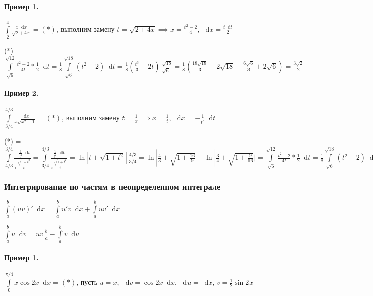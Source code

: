 \documentclass{article}
\newcommand*\diff{\mathop{}\!\mathrm{d}}
\begin{document}
\paragraph{Пример 1.} $\int\limits_{2}^{4} \frac{x \diff x}{\sqrt{2 + 4x}} = (*)$, выполним замену $t = \sqrt{2 + 4x} \implies x = \frac{t^2 - 2}{4}$, $\diff x = \frac{t \diff t}{2}$

(*) = $\int\limits_{\sqrt{6}}^{\sqrt{12}} \frac{t^2 - 2}{4t} * \frac{1}{2} \diff t = \frac{1}{8} \int\limits_{\sqrt{6}}^{\sqrt{18}} (t^2 - 2) \diff t = \frac{1}{8} (\frac{t^3}{3} - 2t) \bigg|_{\sqrt{6}}^{\sqrt{18}} = \frac{1}{8} (\frac{18 \sqrt{18}}{3} - 2 \sqrt{18} - \frac{6\sqrt{6}}{3} + 2 \sqrt{6}) = \frac{3\sqrt{2}}{2}$

\paragraph{Пример 2. } $\int\limits_{3/4}^{4/3} \frac{\diff x}{x\sqrt{x^2 + 1}} = (*)$, выполним замену $t = \frac{1}{x} \implies x = \frac{1}{t}$, $\diff x = -\frac{1}{t^2} \diff t$

(*) = $
\int\limits_{4/3}^{3/4} \frac{-\frac{1}{t^2} \diff t}{\frac{1}{t} \frac{\sqrt{1 + t^2}}{t}} = \int\limits_{3/4}^{4/3} \frac{\frac{1}{t^2} \diff t}{\frac{1}{t} \frac{\sqrt{1 + t^2}}{t}} = \ln |t + \sqrt{1 + t^2}| \bigg|_{3/4}^{4/3} = \ln |\frac{4}{3} + \sqrt{1 + \frac{16}{9}} - \ln |\frac{3}{4} + \sqrt{1 + \frac{9}{16}}| = \int\limits_{\sqrt{6}}^{\sqrt{12}} \frac{t^2 - 2}{4t} * \frac{1}{2} \diff t = \frac{1}{8} \int\limits_{\sqrt{6}}^{\sqrt{18}} (t^2 - 2) \diff t = \frac{1}{8} (\frac{t^3}{3} - 2t) \bigg|_{\sqrt{6}}^{\sqrt{18}} = \ln \frac{3}{2}
$


\subsubsection{Интегрирование по частям в неопределенном интеграле}

$\int\limits_{a}^{b} (u v)' \diff x = \int\limits_{a}^{b} u' v \diff x + \int\limits_{a}^{b} u v' \diff x$

$\int\limits_{a}^{b} u \diff v = u v \bigg|_{a}^{b} - \int\limits_{a}^{b} v \diff u$

\paragraph{Пример 1. } $\int\limits_{0}^{\pi/4} x \cos 2x \diff x = (*)$, пусть $u = x$, $\diff v = \cos 2 x \diff x$, $\diff u = \diff x$, $v = \frac{1}{2} \sin 2x$
\end{document}
